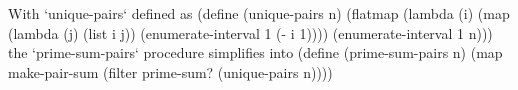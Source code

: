With `unique-pairs` defined as
\begtt\scm
(define (unique-pairs n)
  (flatmap (lambda (i)
             (map (lambda (j) (list i j))
                  (enumerate-interval 1 (- i 1))))
           (enumerate-interval 1 n)))
\endtt
the `prime-sum-pairs` procedure simplifies into
\begtt\scm
(define (prime-sum-pairs n)
  (map make-pair-sum
       (filter prime-sum?
               (unique-pairs n))))
\endtt
